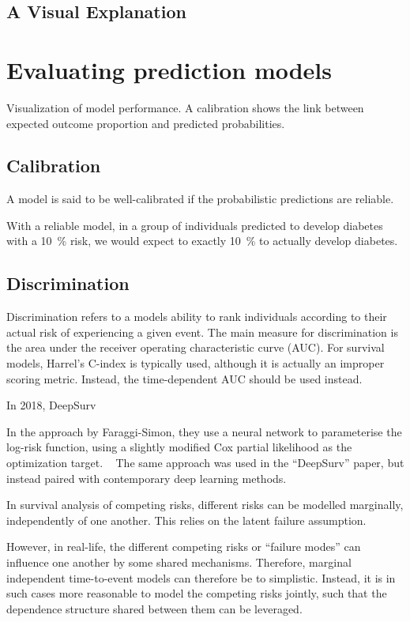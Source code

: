 \subsection{A Visual Explanation}


\section{Evaluating prediction models}

Visualization of model performance.
A calibration shows the link between 
expected outcome proportion 
and predicted probabilities.

\subsection{Calibration}

A model is said to be well-calibrated
if the probabilistic predictions are reliable.

With a reliable model, 
in a group of individuals predicted to develop diabetes
with a \SI{10}{\percent} risk, 
we would expect to exactly \SI{10}{\percent} to actually develop diabetes.


\subsection{Discrimination}

Discrimination refers to a models ability to rank individuals according 
to their actual risk of experiencing a given event.
The main measure for discrimination is the area under the receiver
operating characteristic curve (AUC).
For survival models, Harrel's C-index is typically used,
although it is actually an improper scoring metric.
Instead, the time-dependent AUC should be used instead.


In 2018, DeepSurv 

In the approach by Faraggi-Simon, they use a neural network to 
parameterise the log-risk function, using a slightly modified Cox partial 
likelihood as the optimization target.
~\autocite{faraggiNeural1995}
The same approach was used in the \enquote{DeepSurv} paper,
but instead paired with contemporary deep learning methods.
~\autocite{katzmanDeepSurv2018a}


In survival analysis of competing risks, 
different risks can be modelled marginally,
independently of one another.
This relies on the latent failure assumption.

However, in real-life, the different competing risks 
or \enquote{failure modes} can influence one another
by some shared mechanisms.
Therefore, marginal independent time-to-event models
can therefore be to simplistic.
Instead, it is in such cases
more reasonable to model the competing risks jointly,
such that the dependence structure shared between them
can be leveraged.



